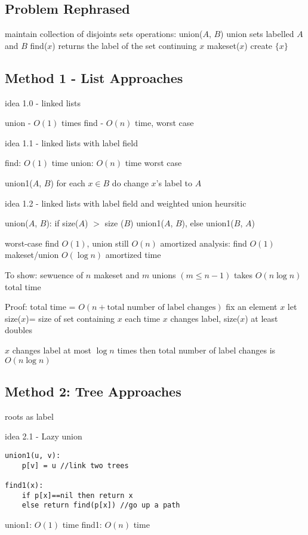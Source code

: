 \documentclass[english,12pt]{article}
\theoremstyle{plain}
\theoremstyle{definition}
\theoremstyle{definition} %
\begin{document}
\subsection{Problem Rephrased}
maintain collection of disjoints sets
operations:
union($A$, $B$) union sets labelled $A$ and $B$
find($x$) returns the label of the set continuing $x$ 
makeset($x$) create $\{x\}$

\subsection{Method 1 - List Approaches}
idea 1.0 - linked lists

union - $O(1)$ times
find - $O(n)$ time, worst case

idea 1.1 - linked lists with label field

find: $O(1)$ time
union: $O(n)$ time worst case

union1($A$, $B$) for each $x\in B$ do change $x$'s label to $A$

idea 1.2 - linked lists with label field and weighted union heursitic

union($A$, $B$): if size($A$) $>$ size ($B$) union1($A$, $B$), else union1($B$, $A$)

worst-case find $O(1)$, union still $O(n)$
amortized analysis: find $O(1)$
makeset/union $O(\log n)$ amortized time

To show: sewuence of $n$ makeset and $m$ unions $(m\le n-1)$ takes $O(n\log n)$ total time

Proof: total time = $O(n + \text{total number of label changes})$
fix an element $x$
let size($x$)= size of set containing $x$
each time $x$ changes label, size($x$) at least doubles

$x$ changes label at most $\log n$ times then total number of label changes is $O(n\log n)$

\subsection{Method 2: Tree Approaches}
roots as label

idea 2.1 - Lazy union
\begin{verbatim}
union1(u, v):
    p[v] = u //link two trees

find1(x):
    if p[x]==nil then return x
    else return find(p[x]) //go up a path
\end{verbatim}

union1: $O(1)$ time
find1: $O(n)$ time
\end{document}
